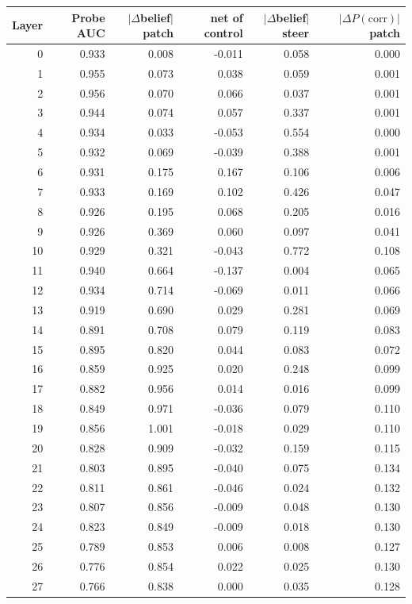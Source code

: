 \begin{tabular}{rrrrrr}
\toprule
Layer & Probe AUC & $|\Delta$belief$|$ patch & net of control & $|\Delta$belief$|$ steer & $|\Delta P(\mathrm{corr})|$ patch \\
\midrule
0 & 0.933 & 0.008 & -0.011 & 0.058 & 0.000 \\
1 & 0.955 & 0.073 & 0.038 & 0.059 & 0.001 \\
2 & 0.956 & 0.070 & 0.066 & 0.037 & 0.001 \\
3 & 0.944 & 0.074 & 0.057 & 0.337 & 0.001 \\
4 & 0.934 & 0.033 & -0.053 & 0.554 & 0.000 \\
5 & 0.932 & 0.069 & -0.039 & 0.388 & 0.001 \\
6 & 0.931 & 0.175 & 0.167 & 0.106 & 0.006 \\
7 & 0.933 & 0.169 & 0.102 & 0.426 & 0.047 \\
8 & 0.926 & 0.195 & 0.068 & 0.205 & 0.016 \\
9 & 0.926 & 0.369 & 0.060 & 0.097 & 0.041 \\
10 & 0.929 & 0.321 & -0.043 & 0.772 & 0.108 \\
11 & 0.940 & 0.664 & -0.137 & 0.004 & 0.065 \\
12 & 0.934 & 0.714 & -0.069 & 0.011 & 0.066 \\
13 & 0.919 & 0.690 & 0.029 & 0.281 & 0.069 \\
14 & 0.891 & 0.708 & 0.079 & 0.119 & 0.083 \\
15 & 0.895 & 0.820 & 0.044 & 0.083 & 0.072 \\
16 & 0.859 & 0.925 & 0.020 & 0.248 & 0.099 \\
17 & 0.882 & 0.956 & 0.014 & 0.016 & 0.099 \\
18 & 0.849 & 0.971 & -0.036 & 0.079 & 0.110 \\
19 & 0.856 & 1.001 & -0.018 & 0.029 & 0.110 \\
20 & 0.828 & 0.909 & -0.032 & 0.159 & 0.115 \\
21 & 0.803 & 0.895 & -0.040 & 0.075 & 0.134 \\
22 & 0.811 & 0.861 & -0.046 & 0.024 & 0.132 \\
23 & 0.807 & 0.856 & -0.009 & 0.048 & 0.130 \\
24 & 0.823 & 0.849 & -0.009 & 0.018 & 0.130 \\
25 & 0.789 & 0.853 & 0.006 & 0.008 & 0.127 \\
26 & 0.776 & 0.854 & 0.022 & 0.025 & 0.130 \\
27 & 0.766 & 0.838 & 0.000 & 0.035 & 0.128 \\
\bottomrule
\end{tabular}
